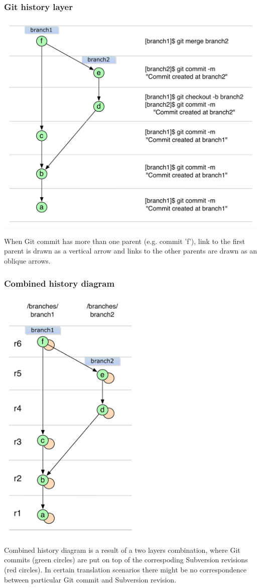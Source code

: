 \subsubsection{Git history layer}
\begin{center}
\includegraphics[width=\textwidth]{img/legend/git_layer.pdf}%
\label{git_layer}%
\end{center}
When Git commit has more than one parent (e.g. commit 'f'), link to the first parent is drawn as a vertical arrow and links to the other 
parents are drawn as an oblique arrows.
\subsubsection{Combined history diagram}
\begin{center}
\includegraphics[width=7.0cm]{img/legend/generalized_history.pdf}%
\label{both_layers}%
\end{center}

Combined history diagram is a result of a two layers combination, where Git commits (green circles) are put on top of the correspoding Subversion revisions (red circles). 
In certain translation scenarios there might be no correspondence between particular Git commit and Subversion revision.